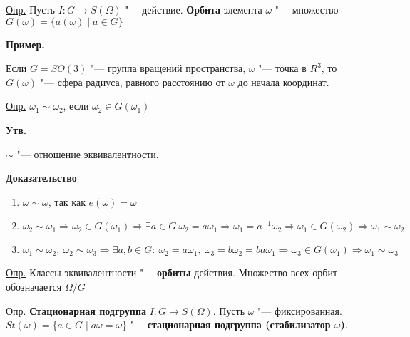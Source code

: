 \documentclass{article}
\begin{document}
\vspace{10pt}

\underline{Опр.} Пусть $I: G \rightarrow S(\Omega)$ "--- действие. \textbf{Орбита} элемента $\omega$ "--- множество $G(\omega) = \{a(\omega) \mid a \in G\}$

\vspace{5pt}

\textbf{Пример.}

Если $G = SO(3)$ "--- группа вращений пространства, $\omega$ "--- точка в $R^3$, то $G(\omega)$ "--- сфера радиуса, равного расстоянию от $\omega$ до начала координат.

\vspace{5pt}

\underline{Опр.} $\omega_1 \sim \omega_2$, если $\omega_2 \in G(\omega_1)$

\vspace{5pt}

\textbf{Утв.}

$\sim$ "--- отношение эквивалентности.

\textbf{Доказательство}
\begin{enumerate}
	\item $\omega \sim \omega$, так как  $e(\omega) = \omega$
	\item $\omega_2 \sim \omega_1 \Rightarrow \omega_2 \in G(\omega_1) \Rightarrow \exists a \in G \  \omega_2 = a\omega_1 \Rightarrow \omega_1 = a^{-1}\omega_2 \Rightarrow \omega_1 \in G(\omega_2) \Rightarrow \omega_1 \sim \omega_2$
	\item $\omega_1 \sim \omega_2, \   \omega_2 \sim \omega_3 \Rightarrow \exists a, b \in G:\  \omega_2 = a\omega_1, \   \omega_3 = b\omega_2 = ba\omega_1 \Rightarrow \omega_3 \in G(\omega_1) \Rightarrow \omega_1 \sim \omega_3$
\end{enumerate}

\vspace{5pt}

\underline{Опр.} Классы эквивалентности "--- \textbf{орбиты} действия. Множество всех орбит обозначается $\Omega/G$

\vspace{5pt}

\underline{Опр.} \textbf{Стационарная подгруппа} $I: G \rightarrow S(\Omega)$. Пусть $\omega$ "--- фиксированная. $St(\omega) = \{a \in G \mid a\omega = \omega\}$ "--- \textbf{стационарная подгруппа (стабилизатор $\omega$)}.

\vspace{5pt}
\end{document}
